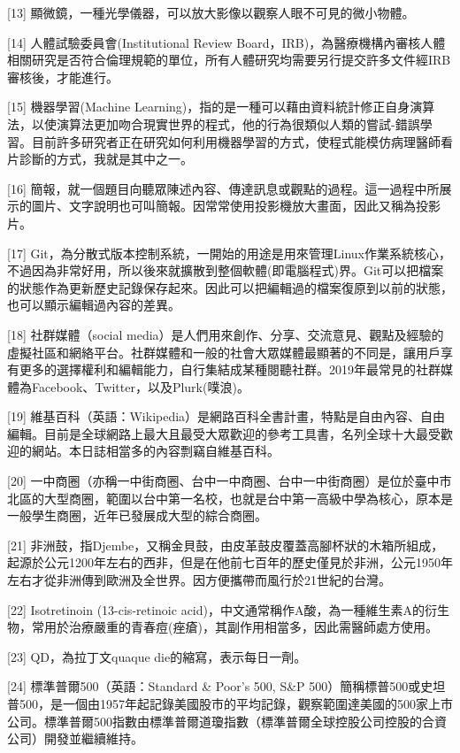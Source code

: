 \documentclass[a5paper, 11pt
]{book}
\begin{document}
{[}13{]} 顯微鏡，一種光學儀器，可以放大影像以觀察人眼不可見的微小物體。

{[}14{]} 人體試驗委員會(Institutional Review
Board，IRB)，為醫療機構內審核人體相關研究是否符合倫理規範的單位，所有人體研究均需要另行提交許多文件經IRB審核後，才能進行。

{[}15{]} 機器學習(Machine
Learning)，指的是一種可以藉由資料統計修正自身演算法，以使演算法更加吻合現實世界的程式，他的行為很類似人類的嘗試-錯誤學習。目前許多研究者正在研究如何利用機器學習的方式，使程式能模仿病理醫師看片診斷的方式，我就是其中之一。

{[}16{]}
簡報，就一個題目向聽眾陳述內容、傳達訊息或觀點的過程。這一過程中所展示的圖片、文字說明也可叫簡報。因常常使用投影機放大畫面，因此又稱為投影片。

{[}17{]}
Git，為分散式版本控制系統，一開始的用途是用來管理Linux作業系統核心，不過因為非常好用，所以後來就擴散到整個軟體(即電腦程式)界。Git可以把檔案的狀態作為更新歷史記錄保存起來。因此可以把編輯過的檔案復原到以前的狀態，也可以顯示編輯過內容的差異。

{[}18{]} 社群媒體（social
media）是人們用來創作、分享、交流意見、觀點及經驗的虛擬社區和網絡平台。社群媒體和一般的社會大眾媒體最顯著的不同是，讓用戶享有更多的選擇權利和編輯能力，自行集結成某種閱聽社群。2019年最常見的社群媒體為Facebook、Twitter，以及Plurk(噗浪)。

{[}19{]}
維基百科（英語：Wikipedia）是網路百科全書計畫，特點是自由內容、自由編輯。目前是全球網路上最大且最受大眾歡迎的參考工具書，名列全球十大最受歡迎的網站。本日誌相當多的內容剽竊自維基百科。

{[}20{]}
一中商圈（亦稱一中街商圈、台中一中商圈、台中一中街商圈）是位於臺中市北區的大型商圈，範圍以台中第一名校，也就是台中第一高級中學為核心，原本是一般學生商圈，近年已發展成大型的綜合商圈。

{[}21{]}
非洲鼓，指Djembe，又稱金貝鼓，由皮革鼓皮覆蓋高腳杯狀的木箱所組成，起源於公元1200年左右的西非，但是在他前七百年的歷史僅見於非洲，公元1950年左右才從非洲傳到歐洲及全世界。因方便攜帶而風行於21世紀的台灣。

{[}22{]} Isotretinoin (13-cis-retinoic
acid)，中文通常稱作A酸，為一種維生素A的衍生物，常用於治療嚴重的青春痘(痤瘡)，其副作用相當多，因此需醫師處方使用。

{[}23{]} QD，為拉丁文quaque die的縮寫，表示每日一劑。

{[}24{]} 標準普爾500（英語：Standard \& Poor's 500, S\&P
500）簡稱標普500或史坦普500，是一個由1957年起記錄美國股市的平均記錄，觀察範圍達美國的500家上市公司。標準普爾500指數由標準普爾道瓊指數（標準普爾全球控股公司控股的合資公司）開發並繼續維持。
\end{document}
